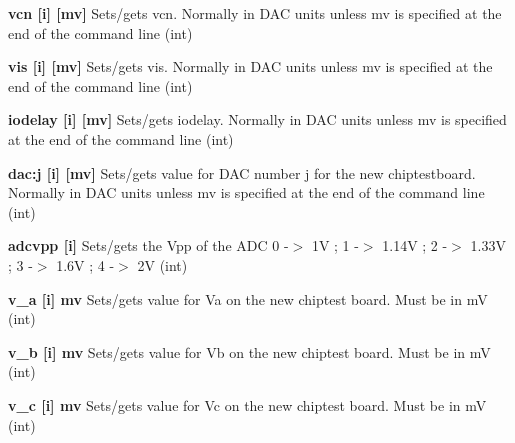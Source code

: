 \begin{DoxyItemize}
\item {\bfseries vcn \mbox{[}i\mbox{]} \mbox{[}mv\mbox{]}} Sets/gets vcn. Normally in DAC units unless {\ttfamily mv} is specified at the end of the command line (int)
\end{DoxyItemize}


\begin{DoxyItemize}
\item {\bfseries vis \mbox{[}i\mbox{]} \mbox{[}mv\mbox{]}} Sets/gets vis. Normally in DAC units unless {\ttfamily mv} is specified at the end of the command line (int)
\end{DoxyItemize}


\begin{DoxyItemize}
\item {\bfseries iodelay \mbox{[}i\mbox{]} \mbox{[}mv\mbox{]}} Sets/gets iodelay. Normally in DAC units unless {\ttfamily mv} is specified at the end of the command line (int)
\end{DoxyItemize}


\begin{DoxyItemize}
\item {\bfseries dac:j \mbox{[}i\mbox{]} \mbox{[}mv\mbox{]}} Sets/gets value for DAC number j for the new chiptestboard. Normally in DAC units unless {\ttfamily mv} is specified at the end of the command line (int)
\end{DoxyItemize}


\begin{DoxyItemize}
\item {\bfseries adcvpp \mbox{[}i\mbox{]} } Sets/gets the Vpp of the ADC 0 -\/$>$ 1V ; 1 -\/$>$ 1.14V ; 2 -\/$>$ 1.33V ; 3 -\/$>$ 1.6V ; 4 -\/$>$ 2V (int)
\end{DoxyItemize}


\begin{DoxyItemize}
\item {\bfseries v\_\-a \mbox{[}i\mbox{]} mv} Sets/gets value for Va on the new chiptest board. Must be in mV (int)
\end{DoxyItemize}


\begin{DoxyItemize}
\item {\bfseries v\_\-b \mbox{[}i\mbox{]} mv} Sets/gets value for Vb on the new chiptest board. Must be in mV (int)
\end{DoxyItemize}


\begin{DoxyItemize}
\item {\bfseries v\_\-c \mbox{[}i\mbox{]} mv} Sets/gets value for Vc on the new chiptest board. Must be in mV (int)
\end{DoxyItemize}


